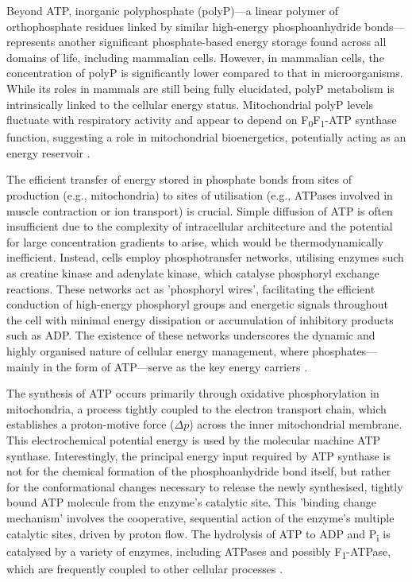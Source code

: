 Beyond ATP, inorganic polyphosphate (polyP)—a linear polymer of orthophosphate residues linked by similar high-energy phosphoanhydride bonds—represents another significant phosphate-based energy storage found across all domains of life, including mammalian cells. However, in mammalian cells, the concentration of polyP is significantly lower compared to that in microorganisms. While its roles in mammals are still being fully elucidated, polyP metabolism is intrinsically linked to the cellular energy status. Mitochondrial polyP levels fluctuate with respiratory activity and appear to depend on F\textsubscript{0}F\textsubscript{1}-ATP synthase function, suggesting a role in mitochondrial bioenergetics, potentially acting as an energy reservoir \citep{pavlovInorganicPolyphosphateEnergy2010}.

The efficient transfer of energy stored in phosphate bonds from sites of production (e.g., mitochondria) to sites of utilisation (e.g., ATPases involved in muscle contraction or ion transport) is crucial. Simple diffusion of ATP is often insufficient due to the complexity of intracellular architecture and the potential for large concentration gradients to arise, which would be thermodynamically inefficient. Instead, cells employ phosphotransfer networks, utilising enzymes such as creatine kinase and adenylate kinase, which catalyse phosphoryl exchange reactions. These networks act as 'phosphoryl wires', facilitating the efficient conduction of high-energy phosphoryl groups and energetic signals throughout the cell with minimal energy dissipation or accumulation of inhibitory products such as ADP. The existence of these networks underscores the dynamic and highly organised nature of cellular energy management, where phosphates—mainly in the form of ATP—serve as the key energy carriers \citep{dzejaPhosphotransferNetworksCellular2003}.

The synthesis of ATP occurs primarily through oxidative phosphorylation in mitochondria, a process tightly coupled to the electron transport chain, which establishes a proton-motive force ($\Delta p$) across the inner mitochondrial membrane. This electrochemical potential energy is used by the molecular machine ATP synthase. Interestingly, the principal energy input required by ATP synthase is not for the chemical formation of the phosphoanhydride bond itself, but rather for the conformational changes necessary to release the newly synthesised, tightly bound ATP molecule from the enzyme's catalytic site. This 'binding change mechanism' involves the cooperative, sequential action of the enzyme's multiple catalytic sites, driven by proton flow. The hydrolysis of ATP to ADP and P\textsubscript{i} is catalysed by a variety of enzymes, including ATPases and possibly F\textsubscript{1}-ATPase, which are frequently coupled to other cellular processes \citep{boyerEnergyLifeATP1998}.

